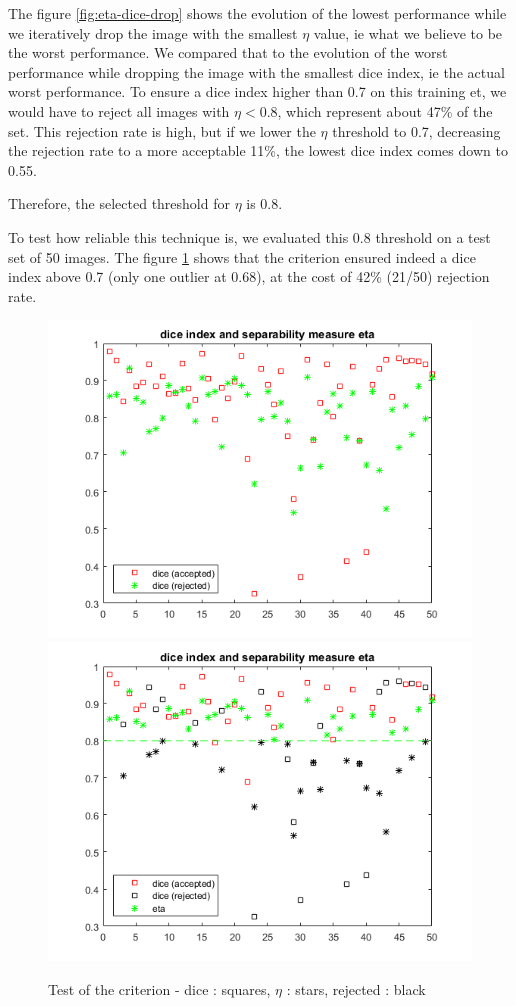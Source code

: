 \documentclass[a4paper,10pt]{article}
\begin{document}
The figure \ref{fig:eta-dice-drop} shows the evolution of the lowest performance while we iteratively drop the image with the smallest $\eta$ value, ie what we believe to be the worst performance. We compared that to the evolution of the worst performance while dropping the image with the smallest dice index, ie the actual worst performance. To ensure a dice index higher than 0.7 on this training et, we would have to reject all images with $\eta < 0.8$, which represent about 47\% of the set. This rejection rate is high, but if we lower the $\eta$ threshold to 0.7, decreasing the rejection rate to a more acceptable 11\%, the lowest dice index comes down to 0.55. 

Therefore, the selected threshold for $\eta$ is 0.8.

To test how reliable this technique is, we evaluated this 0.8 threshold on a test set of 50 images. The figure \ref{fig:test-criterion-accepted} shows that the criterion ensured indeed a dice index above 0.7 (only one outlier at 0.68), at the cost of 42\% (21/50) rejection rate.



\begin{figure}[h]
	\centering
	\includegraphics[width=0.6\linewidth]{../results/selection-criterion/test-dice-eta-plot}
	\includegraphics[width=0.6\linewidth]{../results/selection-criterion/test-dice-eta-accepted}
	\caption{Test of the criterion - dice : squares, $\eta$ : stars, rejected : black }
	\label{fig:test-criterion-accepted}
\end{figure}
\end{document}
